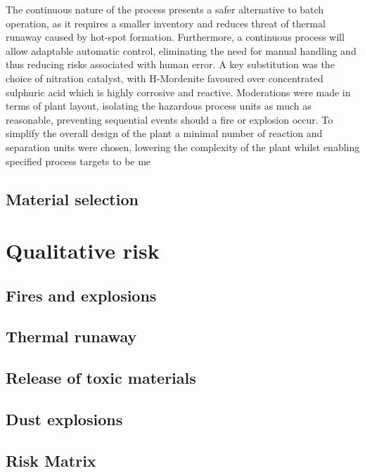 The continuous nature of the process presents a safer alternative to batch operation, as it requires a smaller inventory and reduces threat of thermal runaway caused by hot-spot formation. Furthermore, a continuous process will allow adaptable automatic control, eliminating the need for manual handling and thus reducing risks associated with human error.  A key substitution was the choice of nitration catalyst, with H-Mordenite favoured over concentrated sulphuric acid which is highly corrosive and reactive. 
Moderations were made in terms of plant layout, isolating the hazardous process units as much as reasonable, preventing sequential events should a fire or explosion occur. To simplify the overall design of the plant a minimal number of reaction and separation units were chosen, lowering the complexity of the plant whilst enabling specified process targets to be me




\subsection{Material selection}

\section{Qualitative risk}
\subsection{Fires and explosions}
\subsection{Thermal runaway}
\subsection{Release of toxic materials}
\subsection{Dust explosions}
\subsection{Risk Matrix}